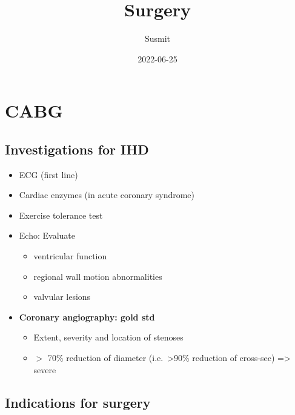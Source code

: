\documentclass[
  14pt,
]{memoir}
\title{Surgery}
\author{Susmit}
\date{2022-06-25}
\providecommand{\tightlist}{%
  \setlength{\itemsep}{0pt}\setlength{\parskip}{0pt}}
\begin{document}
\frontmatter
\maketitle

\mainmatter
\openany  \raggedbottom \twocoltocetc \tableofcontents

\pagebreak

\hypertarget{cabg}{%
\chapter{CABG}\label{cabg}}

\hypertarget{investigations-for-ihd}{%
\section{Investigations for IHD}\label{investigations-for-ihd}}

\begin{itemize}
\tightlist
\item
  ECG (first line)
\item
  Cardiac enzymes (in acute coronary syndrome)
\item
  Exercise tolerance test
\item
  Echo: Evaluate

  \begin{itemize}
  \tightlist
  \item
    ventricular function
  \item
    regional wall motion abnormalities
  \item
    valvular lesions
  \end{itemize}
\item
  \textbf{Coronary angiography: gold std}

  \begin{itemize}
  \tightlist
  \item
    Extent, severity and location of stenoses
  \item
    \(>\) 70\% reduction of diameter (i.e.~\textgreater90\% reduction of
    cross-sec) =\textgreater{} severe
  \end{itemize}
\end{itemize}

\hypertarget{indications-for-surgery}{%
\section{Indications for surgery}\label{indications-for-surgery}}
\end{document}
